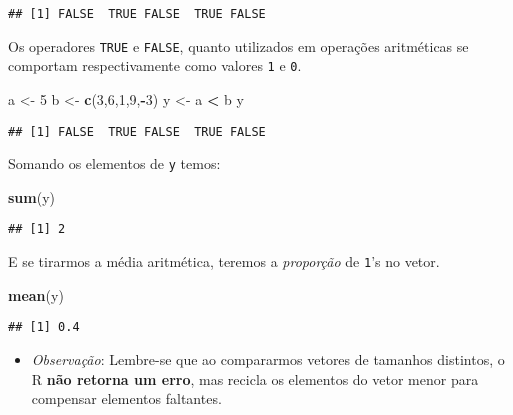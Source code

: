 \documentclass[
]{book}
\newenvironment{Shaded}{\begin{snugshade}}{\end{snugshade}}
\newcommand{\DecValTok}[1]{\textcolor[rgb]{0.00,0.00,0.81}{#1}}
\newcommand{\KeywordTok}[1]{\textcolor[rgb]{0.13,0.29,0.53}{\textbf{#1}}}
\newcommand{\NormalTok}[1]{#1}
\newcommand{\OperatorTok}[1]{\textcolor[rgb]{0.81,0.36,0.00}{\textbf{#1}}}
\newcommand{\StringTok}[1]{\textcolor[rgb]{0.31,0.60,0.02}{#1}}
\providecommand{\tightlist}{%
  \setlength{\itemsep}{0pt}\setlength{\parskip}{0pt}}
\begin{document}
\begin{verbatim}
## [1] FALSE  TRUE FALSE  TRUE FALSE
\end{verbatim}

Os operadores \texttt{TRUE} e \texttt{FALSE}, quanto utilizados em operações aritméticas se comportam respectivamente como valores \texttt{1} e \texttt{0}.

\begin{Shaded}
\begin{Highlighting}[]
\NormalTok{a <-}\StringTok{ }\DecValTok{5}
\NormalTok{b <-}\StringTok{ }\KeywordTok{c}\NormalTok{(}\DecValTok{3}\NormalTok{,}\DecValTok{6}\NormalTok{,}\DecValTok{1}\NormalTok{,}\DecValTok{9}\NormalTok{,}\OperatorTok{-}\DecValTok{3}\NormalTok{)}
\NormalTok{y <-}\StringTok{ }\NormalTok{a }\OperatorTok{<}\StringTok{ }\NormalTok{b}
\NormalTok{y}
\end{Highlighting}
\end{Shaded}

\begin{verbatim}
## [1] FALSE  TRUE FALSE  TRUE FALSE
\end{verbatim}

Somando os elementos de \texttt{y} temos:

\begin{Shaded}
\begin{Highlighting}[]
\KeywordTok{sum}\NormalTok{(y)}
\end{Highlighting}
\end{Shaded}

\begin{verbatim}
## [1] 2
\end{verbatim}

E se tirarmos a média aritmética, teremos a \emph{proporção} de \texttt{1}'s no vetor.

\begin{Shaded}
\begin{Highlighting}[]
\KeywordTok{mean}\NormalTok{(y)}
\end{Highlighting}
\end{Shaded}

\begin{verbatim}
## [1] 0.4
\end{verbatim}

\begin{itemize}
\tightlist
\item
  \emph{Observação}: Lembre-se que ao compararmos vetores de tamanhos distintos, o R \textbf{não retorna um erro}, mas recicla os elementos do vetor menor para compensar elementos faltantes.
\end{itemize}
\end{document}
